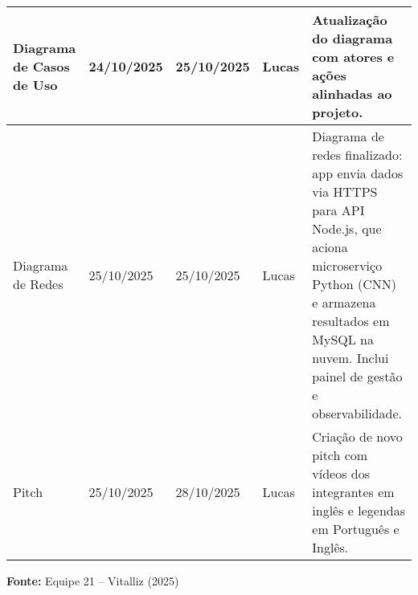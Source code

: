 \begin{center}
\begin{adjustbox}{max width=\textwidth}
\begin{tabular}{|m{3.5cm}|m{2.2cm}|m{2.2cm}|m{3.5cm}|m{6.5cm}|}
Diagrama de Casos de Uso & 24/10/2025 & 25/10/2025 & Lucas & Atualização do diagrama com atores e ações alinhadas ao projeto. \\ \hline

Diagrama de Redes & 25/10/2025 & 25/10/2025 & Lucas & Diagrama de redes finalizado: app envia dados via HTTPS para API Node.js, que aciona microserviço Python (CNN) e armazena resultados em MySQL na nuvem. Inclui painel de gestão e observabilidade. \\ \hline

Pitch & 25/10/2025 & 28/10/2025 & Lucas & Criação de novo pitch com vídeos dos integrantes em inglês e legendas em Português e Inglês. \\ \hline

\end{tabular}
\end{adjustbox}

\vspace{0.3em}
\small{\textbf{Fonte:} Equipe 21 – Vitalliz (2025)}

\end{center}
\medskip